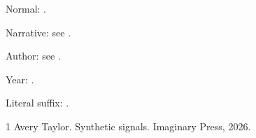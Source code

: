 \documentclass{article}
\begin{document}
Normal: \citep[see][p.~12, note]{Example2026}.

Narrative: see \citet[p.~12, note]{Example2026}.

Author: see \citeauthor{Example2026}.

Year: \citeyearpar[see][p.~12, note]{Example2026}.

Literal suffix: \citep[12]{Example2026}.
\begin{thebibliography}{1}
 Avery Taylor. Synthetic signals. Imaginary Press, 2026.
\end{thebibliography}
\end{document}
